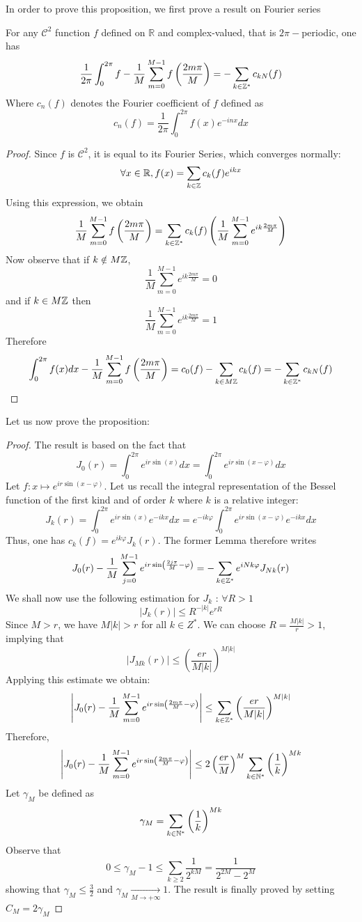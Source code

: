 \documentclass[11pt,a4paper]{article}
\begin{document}
In order to prove this proposition, we first prove a result on Fourier series
\begin{Lem} For any $\mathcal{C}^2$ function $f$ defined on $\mathbb{R}$ and complex-valued, that is $2\pi-$periodic, one has \[\dfrac{1}{2\pi}\int_{0}^{2\pi}f - \dfrac{1}{M}\sum_{m=0}^{M-1}f\left(\frac{2m\pi}{M} \right) = - \sum\limits_{k \in \mathbb{Z}^*}c_{kN}(f)\]
Where $c_n(f)$ denotes the Fourier coefficient of $f$ defined as \[c_n(f) = \dfrac{1}{2\pi}\int_{0}^{2\pi}f(x)e^{-inx}dx\]
\begin{proof}
Since $f$ is $\mathcal{C}^2$, it is equal to its Fourier Series, which converges normally: \[\forall x \in \mathbb{R}, f(x) = \sum_{k\in\mathbb{Z}} c_k(f)e^{ikx}\] Using this expression, we obtain \[\dfrac{1}{M}\sum_{m=0}^{M-1}f\left(\frac{2m\pi}{M}\right) = \sum\limits_{k\in \mathbb{Z}^*}c_k(f)\left(\frac{1}{M}\sum_{m=0}^{M-1}e^{ik\frac{2m\pi}{M}}\right)\] Now observe that if $k\notin M\mathbb{Z}$, \[\dfrac{1}{M}\sum_{m=0}^{M-1}e^{ik\frac{2m\pi}{M}} = 0\] and if $k\in M\mathbb{Z}$ then \[\dfrac{1}{M}\sum_{m=0}^{M-1}e^{ik\frac{2m\pi}{M}} = 1\] Therefore \[\int_{0}^{2\pi}f(x)dx - \dfrac{1}{M}\sum_{m=0}^{M-1}f\left(\frac{2m\pi}{M} \right) = c_0(f) - \sum\limits_{k \in M\mathbb{Z}}c_{k}(f) = - \sum\limits_{k \in \mathbb{Z}^*}c_{kN}(f)\]
\end{proof}
\end{Lem}

Let us now prove the proposition: 
\begin{proof}
The result is based on the fact that \[J_0(r) =  \int_0^{2\pi} e^{ir\sin(x)}dx = \int_0^{2\pi} e^{ir\sin(x - \varphi)}dx\] Let $f : x \mapsto e^{ir\sin(x - \varphi)}$. Let us recall the integral representation of the Bessel function of the first kind and of order $k$ where $k$ is a relative integer: \[J_k(r) =  \int_{0}^{2\pi}e^{ir\sin(x)}e^{-ikx}dx =  e^{-ik\varphi}\int_{0}^{2\pi}e^{ir\sin(x - \varphi)}e^{-ikx}dx\] Thus, one has $c_k(f) = e^{ik\varphi}J_k(r)$. The former Lemma therefore writes \[J_0(r) -  \dfrac{1}{M}\sum_{j=0}^{M-1}e^{ir\sin\left(\frac{2j\pi}{M}-\varphi\right)} = -\sum_{k\in \mathbb{Z}^*}e^{iNk\varphi}J_{Nk}(r)\] We shall now use the following estimation for $J_k$ : $\forall R>1$ \[|J_k(r)| \leq R^{-|k|}e^{rR}\] Since $M > r$, we have $M|k|>r$ for all $k \in Z^*$. We can choose $R = \frac{M|k|}{r} >1$, implying that \[|J_{Mk}(r)|\leq \left(\dfrac{er}{M|k|}\right)^{M|k|} \] Applying this estimate we obtain: \[\left|J_0(r) -  \dfrac{1}{M}\sum_{m=0}^{M-1}e^{ir\sin\left(\frac{2m\pi}{M}-\varphi\right)}\right| \leq \sum_{k\in \mathbb{Z}^*} \left(\dfrac{er}{M|k|}\right)^{M|k|}\] Therefore, \[\left|J_0(r) -  \dfrac{1}{M}\sum_{m=0}^{M-1}e^{ir\sin\left(\frac{2m\pi}{M}-\varphi\right)}\right| \leq 2\left(\dfrac{er}{M}\right)^{M}\sum_{k\in \mathbb{N}^*} \left(\dfrac{1}{k}\right)^{Mk}\]
Let $\gamma_M$ be defined as \[\gamma_M = \sum_{k\in \mathbb{N}^*} \left(\dfrac{1}{k}\right)^{Mk}\] Observe that \[0 \leq \gamma_M -1 \leq \sum_{k\geq 2} \dfrac{1}{2^{kM}} = \dfrac{1}{2^{2M} - 2^M}\] showing that $\gamma_M \leq \frac{3}{2}$ and $\gamma_M \underset{M\to +\infty}{\longrightarrow} 1$. The result is finally proved by setting $C_M = 2\gamma_M$ 

\end{proof}
\afterpage{\clearpage}
\end{document}
